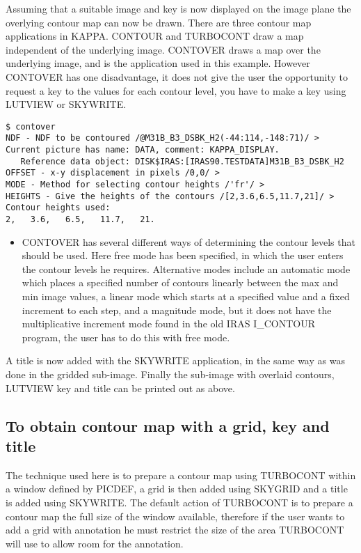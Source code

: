 \documentclass[twoside,11pt]{article}
\begin{document}
Assuming that a suitable image and key is now displayed on the image plane
the overlying contour map can now be drawn. There are three contour map
applications in KAPPA. CONTOUR and TURBOCONT draw a map independent of the
underlying image. CONTOVER draws a map over the underlying image, and is the
application used in this example. However CONTOVER has one
disadvantage, it does not give the user the opportunity to request a key to the
values for each contour level, you have to make a key using LUTVIEW or SKYWRITE.
\begin{small}
\begin{verbatim}
$ contover
NDF - NDF to be contoured /@M31B_B3_DSBK_H2(-44:114,-148:71)/ > 
Current picture has name: DATA, comment: KAPPA_DISPLAY.
   Reference data object: DISK$IRAS:[IRAS90.TESTDATA]M31B_B3_DSBK_H2
OFFSET - x-y displacement in pixels /0,0/ > 
MODE - Method for selecting contour heights /'fr'/ > 
HEIGHTS - Give the heights of the contours /[2,3.6,6.5,11.7,21]/ > 
Contour heights used:
2,   3.6,   6.5,   11.7,   21.
\end{verbatim}
\end{small}
\begin{itemize}
\item CONTOVER  has several different ways of determining the contour 
levels that should be used. Here free mode has been specified, in which the 
user enters the contour levels he requires. Alternative modes include an
automatic mode which places a specified number of contours linearly between the
max and min image values, a linear mode which starts at a specified value and
a fixed increment to each step, and a magnitude mode, but it does not have the
multiplicative increment mode found in the old IRAS I\_CONTOUR program, the user
has to do this with free mode.
\end{itemize}
A title is now added with the SKYWRITE application, in the same way as was done
in the gridded sub-image. Finally the sub-image with overlaid contours, LUTVIEW
key and title can be printed out as above.

\subsection{To obtain contour map with a grid, key and title}
\label{k:contour}
The technique used here is to prepare a contour map using TURBOCONT within a
window defined by PICDEF, a grid is then added using SKYGRID and a title is
added using SKYWRITE. The default action of TURBOCONT is to prepare a contour
map the full size of the window available, therefore if the user wants to add
a grid with annotation he must restrict the size of the area TURBOCONT will
use to allow room for the annotation.
\end{document}
